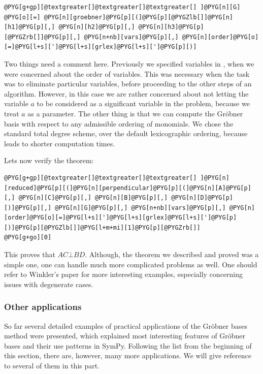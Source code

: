 \begin{Verbatim}[commandchars=@\[\]]
@PYG[g+gp][@textgreater[]@textgreater[]@textgreater[] ]@PYG[n][G] @PYG[o][=] @PYG[n][groebner]@PYG[p][(]@PYG[p][@PYGZlb[]]@PYG[n][h1]@PYG[p][,] @PYG[n][h2]@PYG[p][,] @PYG[n][h3]@PYG[p][@PYGZrb[]]@PYG[p][,] @PYG[n+nb][vars]@PYG[p][,] @PYG[n][order]@PYG[o][=]@PYG[l+s][']@PYG[l+s][grlex]@PYG[l+s][']@PYG[p][)]
\end{Verbatim}
\noindent
Two things need a comment here. Previously we specified variables in , when we were
concerned about the order of variables. This was necessary when the task was to eliminate particular
variables, before proceeding to the other steps of an algorithm. However, in this case we are rather
concerned about not letting the variable $a$ to be considered as a significant variable in the problem,
because we treat $a$ as a parameter. The other thing is that we can compute the Gröbner basis with
respect to any admissible ordering of monomials. We chose the standard total degree scheme, over the
default lexicographic ordering, because leads to shorter computation times.

Lets now verify the theorem:

\begin{Verbatim}[commandchars=@\[\]]
@PYG[g+gp][@textgreater[]@textgreater[]@textgreater[] ]@PYG[n][reduced]@PYG[p][(]@PYG[n][perpendicular]@PYG[p][(]@PYG[n][A]@PYG[p][,] @PYG[n][C]@PYG[p][,] @PYG[n][B]@PYG[p][,] @PYG[n][D]@PYG[p][)]@PYG[p][,] @PYG[n][G]@PYG[p][,] @PYG[n+nb][vars]@PYG[p][,] @PYG[n][order]@PYG[o][=]@PYG[l+s][']@PYG[l+s][grlex]@PYG[l+s][']@PYG[p][)]@PYG[p][@PYGZlb[]]@PYG[l+m+mi][1]@PYG[p][@PYGZrb[]]
@PYG[g+go][0]
\end{Verbatim}
\noindent
This proves that $AC \bot BD$. Although, the theorem we described and proved was a simple one, one can
handle much more complicated problems as well. One should refer to Winkler's paper for more interesting
examples, especially concerning issues with degenerate cases.


\subsubsection{Other applications}

So far several detailed examples of practical applications of the Gröbner bases method were
presented, which explained most interesting features of Gröbner bases and their use patterns
in SymPy. Following the list from the beginning of this section, there are, however, many more
applications. We will give reference to several of them in this part.

